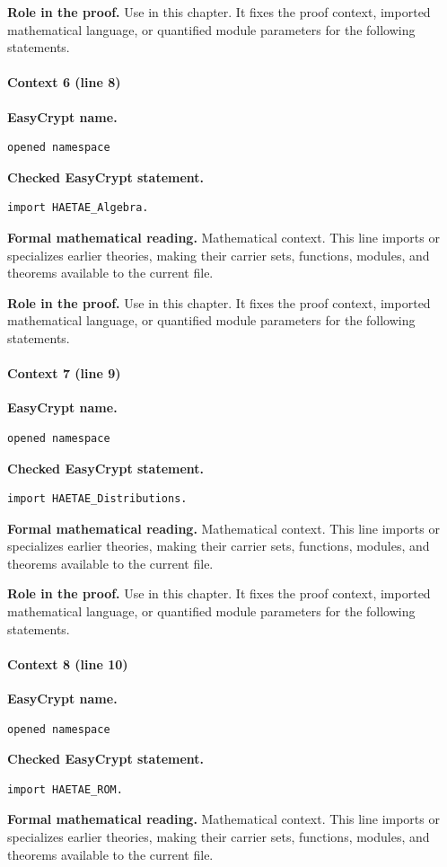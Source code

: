 \noindent\textbf{Role in the proof.}
Use in this chapter. It fixes the proof context, imported mathematical language, or quantified module parameters for the following statements.

\paragraph{Context 6 (line 8)}
\noindent\textbf{EasyCrypt name.}
\begin{lstlisting}[language=EasyCrypt,basicstyle=\ttfamily\scriptsize]
opened namespace
\end{lstlisting}
\noindent\textbf{Checked EasyCrypt statement.}
\begin{lstlisting}[language=EasyCrypt,basicstyle=\ttfamily\scriptsize]
import HAETAE_Algebra.
\end{lstlisting}
\noindent\textbf{Formal mathematical reading.}
Mathematical context. This line imports or specializes earlier theories, making their carrier sets, functions, modules, and theorems available to the current file.

\noindent\textbf{Role in the proof.}
Use in this chapter. It fixes the proof context, imported mathematical language, or quantified module parameters for the following statements.

\paragraph{Context 7 (line 9)}
\noindent\textbf{EasyCrypt name.}
\begin{lstlisting}[language=EasyCrypt,basicstyle=\ttfamily\scriptsize]
opened namespace
\end{lstlisting}
\noindent\textbf{Checked EasyCrypt statement.}
\begin{lstlisting}[language=EasyCrypt,basicstyle=\ttfamily\scriptsize]
import HAETAE_Distributions.
\end{lstlisting}
\noindent\textbf{Formal mathematical reading.}
Mathematical context. This line imports or specializes earlier theories, making their carrier sets, functions, modules, and theorems available to the current file.

\noindent\textbf{Role in the proof.}
Use in this chapter. It fixes the proof context, imported mathematical language, or quantified module parameters for the following statements.

\paragraph{Context 8 (line 10)}
\noindent\textbf{EasyCrypt name.}
\begin{lstlisting}[language=EasyCrypt,basicstyle=\ttfamily\scriptsize]
opened namespace
\end{lstlisting}
\noindent\textbf{Checked EasyCrypt statement.}
\begin{lstlisting}[language=EasyCrypt,basicstyle=\ttfamily\scriptsize]
import HAETAE_ROM.
\end{lstlisting}
\noindent\textbf{Formal mathematical reading.}
Mathematical context. This line imports or specializes earlier theories, making their carrier sets, functions, modules, and theorems available to the current file.

